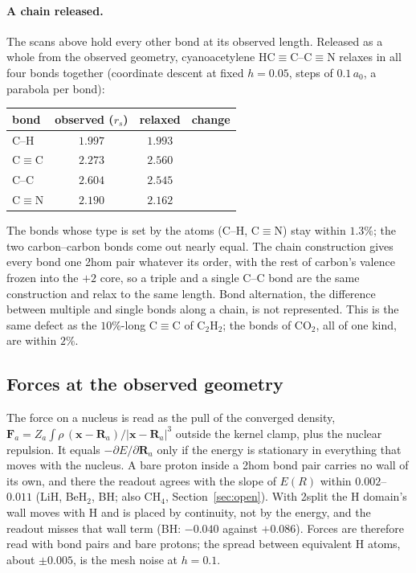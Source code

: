 \documentclass[11pt]{article}
\begin{document}
\paragraph{A chain released.} The scans above hold every other bond at its observed length. Released
as a whole from the observed geometry, cyanoacetylene HC$\equiv$C--C$\equiv$N relaxes in all four bonds
together (coordinate descent at fixed $h = 0.05$, steps of $0.1\,a_0$, a parabola per bond):
\begin{center}
\small
\begin{tabular}{lccc}
\toprule
bond & observed ($r_s$) & relaxed & change \\
\midrule
C--H         & $1.997$ & $1.993$ \\
C$\equiv$C   & $2.273$ & $2.560$ \\
C--C         & $2.604$ & $2.545$ \\
C$\equiv$N   & $2.190$ & $2.162$ \\
\bottomrule
\end{tabular}
\end{center}
The bonds whose type is set by the atoms (C--H, C$\equiv$N) stay within $1.3\%$; the two carbon--carbon
bonds come out nearly equal. The chain construction gives every bond one 2hom pair whatever its
order, with the rest of carbon's valence frozen into the $+2$ core, so a triple and a single C--C bond
are the same construction and relax to the same length. Bond alternation, the difference between
multiple and single bonds along a chain, is not represented. This is the same defect as the
$10\%$-long C$\equiv$C of C$_2$H$_2$; the bonds of CO$_2$, all of one kind, are within $2\%$.


\subsection{Forces at the observed geometry}
\label{sec:forces}

The force on a nucleus is read as the pull of the converged density, $\mathbf{F}_a = Z_a\int\rho\,
(\mathbf{x}-\mathbf{R}_a)/|\mathbf{x}-\mathbf{R}_a|^3$ outside the kernel clamp, plus the nuclear
repulsion. It equals $-\partial E/\partial\mathbf{R}_a$ only if the energy is stationary in everything
that moves with the nucleus. A bare proton inside a 2hom bond pair carries no wall of its own, and
there the readout agrees with the slope of $E(R)$ within $0.002$--$0.011$ (LiH, BeH$_2$, BH; also
CH$_4$, Section~\ref{sec:open}). With 2split the H domain's wall moves with H and is placed by continuity,
not by the energy, and the readout misses that wall term (BH: $-0.040$ against $+0.086$). Forces are therefore read with bond pairs and bare protons; the spread between
equivalent H atoms, about $\pm0.005$, is the mesh noise at $h = 0.1$.
\end{document}

